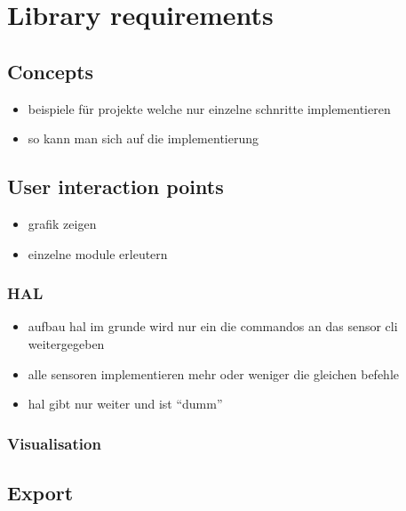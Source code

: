 \hypertarget{library-requirements}{%
\section{Library requirements}\label{library-requirements}}

\hypertarget{concepts}{%
\subsection{Concepts}\label{concepts}}

\begin{itemize}
\tightlist
\item
  beispiele für projekte welche nur einzelne schnritte implementieren
\item
  so kann man sich auf die implementierung
\end{itemize}

\hypertarget{user-interaction-points}{%
\subsection{User interaction points}\label{user-interaction-points}}

\begin{itemize}
\tightlist
\item
  grafik zeigen
\item
  einzelne module erleutern
\end{itemize}

\hypertarget{hal}{%
\subsubsection{HAL}\label{hal}}

\begin{itemize}
\tightlist
\item
  aufbau hal im grunde wird nur ein die commandos an das sensor cli
  weitergegeben
\item
  alle sensoren implementieren mehr oder weniger die gleichen befehle
\item
  hal gibt nur weiter und ist ``dumm''
\end{itemize}

\hypertarget{visualisation}{%
\subsubsection{Visualisation}\label{visualisation}}

\hypertarget{export}{%
\subsection{Export}\label{export}}

